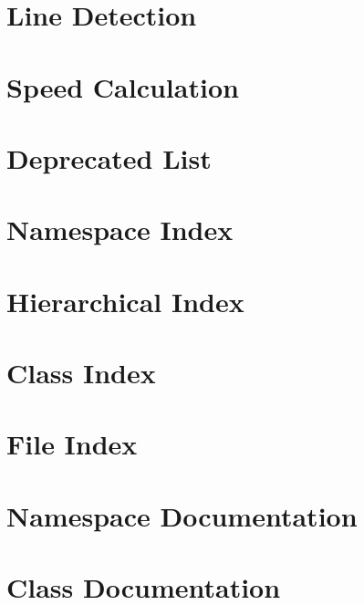 \documentclass[twoside]{book}
\newcommand{\+}{\discretionary{\mbox{\scriptsize$\hookleftarrow$}}{}{}}
\begin{document}
\chapter{Line Detection}
\label{md__docs_markdown__line_detection}

\chapter{Speed Calculation}
\label{md__docs_markdown__speed_calculation}

\chapter{Deprecated List}
\label{deprecated}

\chapter{Namespace Index}

\chapter{Hierarchical Index}

\chapter{Class Index}

\chapter{File Index}

\chapter{Namespace Documentation}

\chapter{Class Documentation}




































\end{document}
